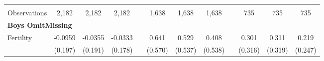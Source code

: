 \begin{landscape}
\begin{table}[htpb!]
\begin{center}
\begin{tabular}{lcccp{2mm}cccp{2mm}ccc}
\begin{footnotesize}\end{footnotesize}&\begin{footnotesize}\end{footnotesize}&\begin{footnotesize}\end{footnotesize}&\begin{footnotesize}\end{footnotesize}&\begin{footnotesize}\end{footnotesize}&\begin{footnotesize}\end{footnotesize}&\begin{footnotesize}\end{footnotesize}&\begin{footnotesize}\end{footnotesize}&\begin{footnotesize}\end{footnotesize}&\begin{footnotesize}\end{footnotesize}&\begin{footnotesize}\end{footnotesize}&\begin{footnotesize}\end{footnotesize}\\Observations&2,182&2,182&2,182&&1,638&1,638&1,638&&735&735&735\\
\multicolumn{12}{l}{\textbf{Boys OmitMissing}}\\ 
Fertility&-0.0959&-0.0355&-0.0333&&0.641&0.529&0.408&&0.301&0.311&0.219\\
&(0.197)&(0.191)&(0.178)&&(0.570)&(0.537)&(0.538)&&(0.316)&(0.319)&(0.247)\\

\end{tabular}
\end{center}
\end{table}
\end{landscape}

